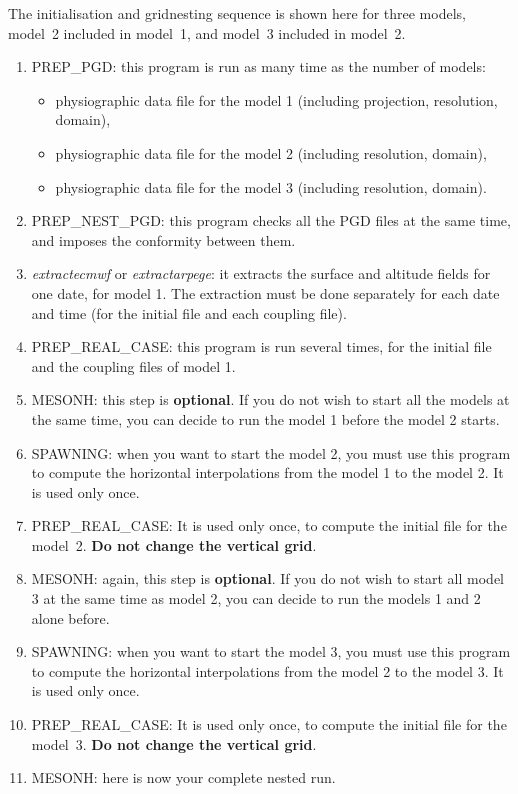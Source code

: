 The initialisation and gridnesting sequence is shown here for three models,
model~2 included in model~1, and model~3 included in model~2.
\begin{enumerate}
\item
{PREP\_PGD}: this program is run as many time as the number of models:
\begin{itemize}
\item physiographic data file for the model 1 (including projection, resolution, domain),
\item physiographic data file for the model 2 (including  resolution, domain),
\item physiographic data file for the model 3 (including  resolution, domain).
\end{itemize}
\item
{PREP\_NEST\_PGD}: this program checks all the PGD files at the same time,
and imposes the conformity between them.
\item
{\sl extractecmwf} or {\sl extractarpege}: it extracts the surface
and altitude fields for one date, for model 1.
The extraction must be done separately for each date and time (for
the initial file and each coupling file).
\item
{PREP\_REAL\_CASE}: this program is run several times, for the initial
file and the coupling files of model 1.
\item
{MESONH}: this step is {\bf optional}. If you do not wish to start
all the models at the same time, you can decide to run the model 1 before
the model 2 starts.
\item
{SPAWNING}: when you want to start the model 2, you must use this
program to compute the horizontal interpolations from the model 1 to the model
2. It is used only once.
\item
{PREP\_REAL\_CASE}: It is used only once, to compute the
initial file for the model~2. {\bf Do not change the vertical grid}.
\item
{MESONH}: again, this step is {\bf optional}. If you do not wish to start
all model 3 at the same time as model 2, you can decide to run
the models 1 and 2 alone before.
\item
{SPAWNING}: when you want to start the model 3, you must use this
program to compute the horizontal interpolations from the model 2 to the model
3. It is used only once.
\item
{PREP\_REAL\_CASE}: It is used only once, to compute the initial
file for the model~3. {\bf Do not change the vertical grid}.
\item
{MESONH}: here is now your complete nested run.
\end{enumerate}

